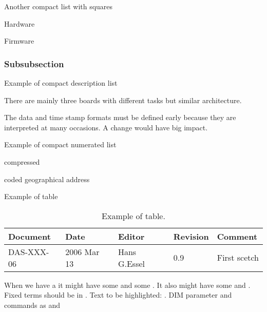 Another compact list with squares
\bbox
\item Hardware
\item Firmware
\ebox

\subsubsection{Subsubsection}

Example of compact description list
\bdes
\item[Hardware] There are mainly three boards with different tasks but similar architecture.
\item[Data formats] The data and time stamp formats must be defined early because they are
interpreted at many occasions. A change would have big impact.
\edes

Example of compact numerated list
\bnum
\item compressed
\item coded geographical address
\enum

Example of table
\begin{table}[h]
\begin{tabular}{|p{2.0cm}|p{2.0cm}|p{3.0cm}|p{1.6cm}|p{5.0cm}|}      \hline
Document   & Date        & Editor       & Revision & Comment      \\ \hline
DAS-XXX-06 & 2006 Mar 13 & Hans G.Essel & 0.9      & First scetch \\ \hline
\end{tabular}
\caption{Example of table.}
\label{XXX-table}
\end{table}

When we have a  it might have some  and some .
It also might have some  and .
Fixed terms should be in . Text to be highlighted: .
DIM parameter and commands as  and 
